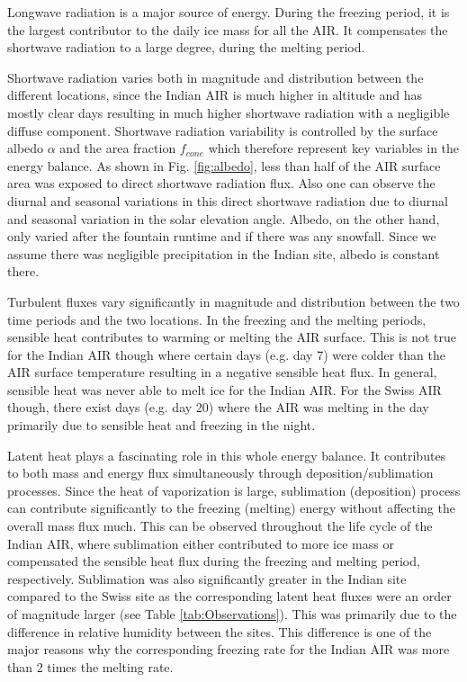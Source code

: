 \documentclass[utf8]{frontiersSCNS} %
\begin{document}
Longwave radiation is a major source of energy. During the freezing period, it is the largest
contributor to the daily ice mass for all the AIR. It compensates the shortwave radiation to a large degree, during the melting period.

Shortwave radiation varies both in magnitude and distribution between the different locations, since the Indian AIR is
much higher in altitude and has mostly clear days resulting in much higher shortwave radiation with a negligible
diffuse component.  Shortwave radiation variability is controlled by the surface albedo $\alpha$ and the area
fraction $f_{cone}$ which therefore represent key variables in the energy balance. As shown in Fig. \ref{fig:albedo},
less than half of the AIR surface area was exposed to direct shortwave radiation flux. Also one can
observe the diurnal and seasonal variations in this direct shortwave radiation due to diurnal and seasonal variation in
the solar elevation angle.  Albedo, on the other hand, only varied after the fountain runtime and if there was any
snowfall. Since we assume there was negligible precipitation in the Indian site, albedo is constant there.

Turbulent fluxes vary significantly in magnitude and distribution between the two time periods and the two locations.
In the freezing and the melting periods, sensible heat contributes to warming or melting the AIR surface. This is not
true for the Indian AIR though where certain days (e.g. day 7) were colder than the AIR surface temperature resulting
in a negative sensible heat flux. In general, sensible heat was never able to melt ice for the Indian AIR. For the Swiss
AIR though, there exist days (e.g. day 20) where the AIR was melting in the day primarily due to sensible heat and
freezing in the night.

Latent heat plays a fascinating role in this whole energy balance. It contributes to both mass and energy flux
simultaneously through deposition/sublimation processes. Since the heat of vaporization is large,
sublimation (deposition) process can contribute significantly to the freezing (melting) energy without affecting the
overall mass flux much. This can be observed throughout the life cycle of the Indian AIR, where sublimation either
contributed to more ice mass or compensated the sensible heat flux during the freezing and melting period, respectively.
Sublimation was also significantly greater in the Indian site compared to the Swiss site as the corresponding latent heat fluxes were an order of magnitude larger (see Table \ref{tab:Observations}). This was primarily due to the difference in relative humidity between the sites. This difference is one of the major reasons why the corresponding freezing rate for the Indian AIR was more than 2 times the melting rate.
\end{document}
